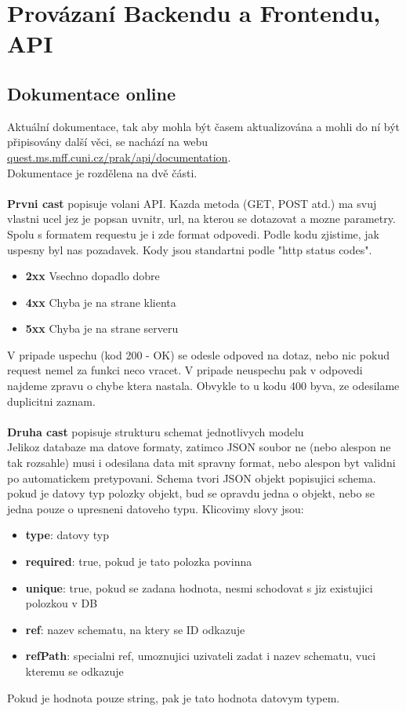 \chapter{Provázaní Backendu a Frontendu, API}

\section{Dokumentace online}
Aktuální dokumentace, tak aby mohla být časem aktualizována a mohli do ní
být připisovány další věci, se nachází na webu 
\href{http://quest.ms.mff.cuni.cz/prak/api/documentation}{quest.ms.mff.cuni.cz/prak/api/documentation}.
\\
Dokumentace je rozdělena na dvě části.
\\
\\
\textbf{Prvni cast} popisuje volani API. 
Kazda metoda (GET, POST atd.) ma svuj vlastni ucel
jez je popsan uvnitr, url, na kterou se dotazovat a mozne parametry.
Spolu s formatem requestu je i zde format odpovedi.
Podle kodu zjistime, jak uspesny byl nas pozadavek.
Kody jsou standartni podle "http status codes".
\begin{itemize}
	\item \textbf{2xx} Vsechno dopadlo dobre
	\item \textbf{4xx} Chyba je na strane klienta
	\item \textbf{5xx} Chyba je na strane serveru
\end{itemize}
V pripade uspechu (kod 200 - OK) se odesle odpoved na dotaz, nebo
nic pokud request nemel za funkci neco vracet. 
V pripade neuspechu pak v odpovedi najdeme zpravu o chybe ktera nastala.
Obvykle to u kodu 400 byva, ze odesilame duplicitni zaznam.
\\
\\
\textbf{Druha cast} popisuje strukturu schemat jednotlivych modelu\\
Jelikoz databaze ma datove formaty, zatimco JSON soubor ne (nebo alespon ne tak rozsahle)
musi i odesilana data mit spravny format, nebo alespon byt validni po automatickem
pretypovani.
Schema tvori JSON objekt popisujici schema.
pokud je datovy typ polozky objekt, bud se opravdu jedna o objekt, nebo
se jedna pouze o upresneni datoveho typu.
Klicovimy slovy jsou:
\begin{itemize}
	\item \textbf{type}: datovy typ
	\item \textbf{required}: true, pokud je tato polozka povinna
	\item \textbf{unique}: true, pokud se zadana hodnota, nesmi schodovat s jiz existujici polozkou v DB
	\item \textbf{ref}: nazev schematu, na ktery se ID odkazuje
	\item \textbf{refPath}: specialni ref, umoznujici uzivateli zadat i nazev schematu, vuci kteremu se odkazuje
\end{itemize}
Pokud je hodnota pouze string, pak je tato hodnota datovym typem.

